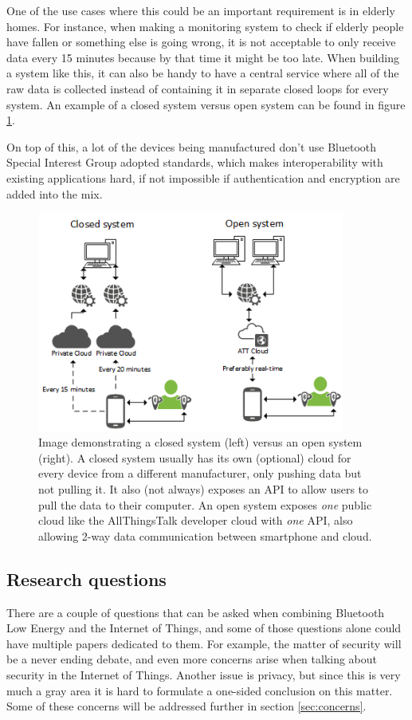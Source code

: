 \documentclass[pdftex,a4paper,12pt,twoside]{report}
\begin{document}
One of the use cases where this could be an important requirement is in elderly homes. For instance, when making a monitoring system to check if elderly people have fallen or something else is going wrong, it is not acceptable to only receive data every 15 minutes because by that time it might be too late. When building a system like this, it can also be handy to have a central service where all of the raw data is collected instead of containing it in separate closed loops for every system. An example of a closed system versus open system can be found in figure \ref{fig:networkloops}.

On top of this, a lot of the devices being manufactured don't use Bluetooth Special Interest Group adopted standards, which makes interoperability with existing applications hard, if not impossible if authentication and encryption are added into the mix.

\begin{figure}[h]
    \centering
    \includegraphics[width=0.9\textwidth]{img/networkloop.png}
    \caption[Image demonstrating a closed cloud system versus an open cloud system]{Image demonstrating a closed system (left) versus an open system (right). A closed system usually has its own (optional) cloud for every device from a different manufacturer, only pushing data but not pulling it. It also (not always) exposes an API to allow users to pull the data to their computer. An open system exposes \textit{one} public cloud like the AllThingsTalk developer cloud with \textit{one} API, also allowing 2-way data communication between smartphone and cloud.}
    \label{fig:networkloops}
\end{figure}

\subsection{Research questions}
\label{subsec:researchquestions}
There are a couple of questions that can be asked when combining Bluetooth Low Energy and the Internet of Things, and some of those questions alone could have multiple papers dedicated to them. For example, the matter of security will be a never ending debate, and even more concerns arise when talking about security in the Internet of Things. Another issue is privacy, but since this is very much a gray area it is hard to formulate a one-sided conclusion on this matter. Some of these concerns will be addressed further in section \ref{sec:concerns}.
\end{document}

